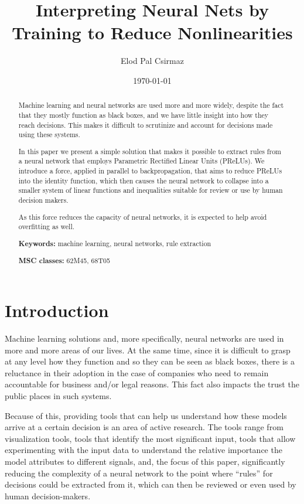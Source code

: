 \documentclass{article}[12pt]
\title{Interpreting Neural Nets by Training to Reduce Nonlinearities}
\author{Elod Pal Csirmaz\\
\texttt{\rot{\rot{maz.}{csir}{ep}com}{@}{elod}}}
\date{\today}
\newcommand{\myskip}{\bigskip\noindent}
\begin{document}
\maketitle

\begin{abstract}
Machine learning and neural networks are used more and more widely,
despite the fact that they mostly function as black boxes, and we
have little insight into how they reach decisions.
This makes it difficult to scrutinize and account for decisions made using these systems.

In this paper we present a simple solution that makes it possible to
extract rules from a neural network that employs Parametric Rectified Linear Units (PReLUs).
We introduce a force, applied in parallel to backpropagation, that
aims to reduce PReLUs into the identity function, which then causes
the neural network to collapse into a smaller system of linear functions and inequalities
suitable for review or use by human decision makers.

As this force reduces the capacity of neural networks, it is expected to help avoid overfitting as well.

\myskip
{\bf Keywords:} %
machine learning,
neural networks,
rule extraction

\myskip
{\bf MSC classes:} %
62M45,  %
68T05   %


\end{abstract}

\section{Introduction}

Machine learning solutions and, more specifically, neural networks are used
in more and more areas of our lives. At the same time, since it is difficult to 
grasp at any level how they function and so they can be seen as black boxes,
there is a reluctance in their adoption in the case of companies who need to
remain accountable for business and/or legal reasons. This fact also impacts
the trust the public places in such systems.

Because of this, providing tools that can help us understand how these
models arrive at a certain decision is an area of active research.
The tools range from visualization tools, tools that identify the
most significant input, tools that allow experimenting with the input data
to understand the relative importance the model attributes to different
signals, and, the focus of this paper, significantly reducing the complexity
of a neural network to the point where ``rules'' for decisions could be
extracted from it, which can then be reviewed or even used by human decision-makers.
\end{document}
